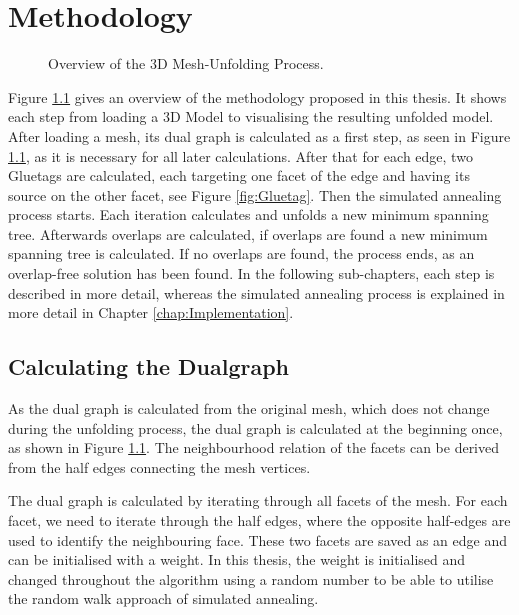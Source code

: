 \documentclass[draft,final]{vutinfth} %
\begin{document}
\chapter{Methodology}
\label{chap:methodology}

\begin{figure}

\caption{Overview of the 3D Mesh-Unfolding Process.}
\label{fig:overview}
\end{figure}

Figure \ref{fig:overview} gives an overview of the methodology proposed in this thesis. It shows each step from loading a 3D Model to visualising the resulting unfolded model. After loading a mesh, its dual graph is calculated as a first step, as seen in Figure \ref{fig:overview}, as it is necessary for all later calculations. After that for each edge, two Gluetags are calculated, each targeting one facet of the edge and having its source on the other facet, see Figure \ref{fig:Gluetag}. Then the simulated annealing process starts. Each iteration calculates and unfolds a new minimum spanning tree. Afterwards overlaps are calculated, if overlaps are found a new minimum spanning tree is calculated. If no overlaps are found, the process ends, as an overlap-free solution has been found. In the following sub-chapters, each step is described in more detail, whereas the simulated annealing process is explained in more detail in Chapter \ref{chap:Implementation}.

\section{Calculating the Dualgraph}
\label{sec:calcdual}
As the dual graph is calculated from the original mesh, which does not change during the unfolding process, the dual graph is calculated at the beginning once, as shown in Figure \ref{fig:overview}. The neighbourhood relation of the facets can be derived from the half edges connecting the mesh vertices. 

The dual graph is calculated by iterating through all facets of the mesh. For each facet, we need to iterate through the half edges, where the opposite half-edges are used to identify the neighbouring face. These two facets are saved as an edge and can be initialised with a weight. In this thesis, the weight is initialised and changed throughout the algorithm using a random number to be able to utilise the random walk approach of simulated annealing.
\end{document}
